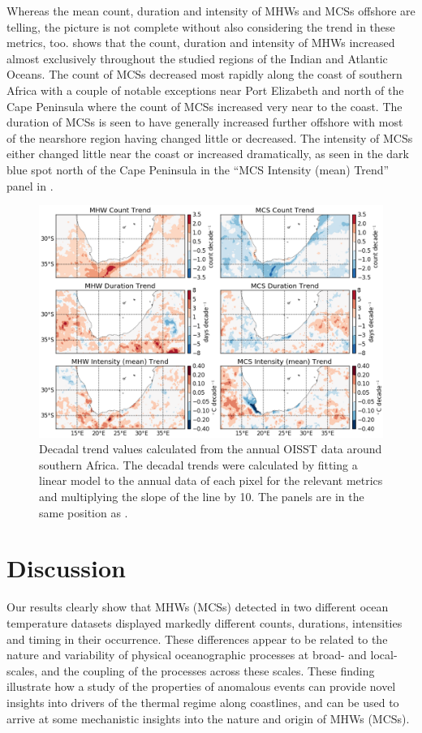 \documentclass[a4paper,10pt,review]{elsarticle}
\begin{document}
Whereas the mean count, duration and intensity of MHWs and MCSs offshore are telling, the picture is not complete without also considering the trend in these metrics, too.  shows that the count, duration and intensity of MHWs increased almost exclusively throughout the studied regions of the Indian and Atlantic Oceans. The count of MCSs decreased most rapidly along the coast of southern Africa with a couple of notable exceptions near Port Elizabeth and north of the Cape Peninsula where the count of MCSs increased very near to the coast. The duration of MCSs is seen to have generally increased further offshore with most of the nearshore region having changed little or decreased. The intensity of MCSs either changed little near the coast or increased dramatically, as seen in the dark blue spot north of the Cape Peninsula in the ``MCS Intensity (mean) Trend'' panel in .

\begin{figure}
\centering \includegraphics[width=1.0\textwidth]{MHW_MCS_trend.png}
\caption{Decadal trend values calculated from the annual OISST data around southern Africa. The decadal trends were calculated by fitting a linear model to the annual data of each pixel for the relevant metrics and multiplying the slope of the line by 10. The panels are in the same position as .}
\label{fig:Figure7}
\end{figure}

\section{Discussion}
Our results clearly show that MHWs (MCSs) detected in two different ocean temperature datasets displayed markedly different counts, durations, intensities and timing in their occurrence. These differences appear to be related to the nature and variability of physical oceanographic processes at broad- and local-scales, and the coupling of the processes across these scales. These finding illustrate how a study of the properties of anomalous events can provide novel insights into drivers of the thermal regime along coastlines, and can be used to arrive at some mechanistic insights into the nature and origin of MHWs (MCSs).
\end{document}
